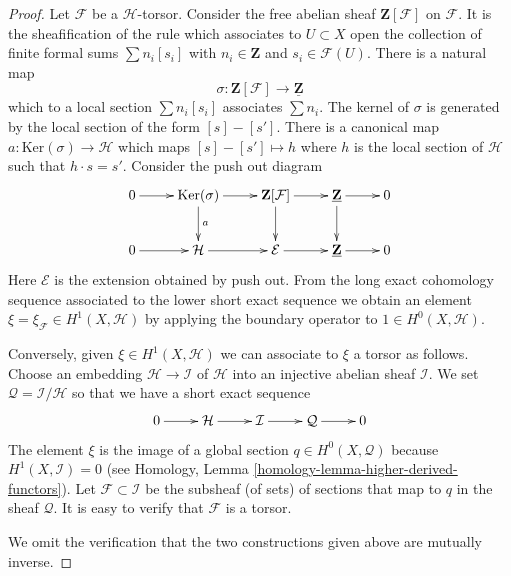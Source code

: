 \begin{proof}
Let $\mathcal{F}$ be a $\mathcal{H}$-torsor.
Consider the free abelian sheaf $\mathbf{Z}[\mathcal{F}]$
on $\mathcal{F}$. It is the sheafification of the rule
which associates to $U \subset X$ open the collection of finite
formal sums $\sum n_i[s_i]$ with $n_i \in \mathbf{Z}$
and $s_i \in \mathcal{F}(U)$. There is a natural map
$$
\sigma : \mathbf{Z}[\mathcal{F}] \longrightarrow \underline{\mathbf{Z}}
$$
which to a local section $\sum n_i[s_i]$ associates $\sum n_i$.
The kernel of $\sigma$ is generated by the local section of the form
$[s] - [s']$. There is a canonical map
$a : \text{Ker}(\sigma) \to \mathcal{H}$
which maps $[s] - [s'] \mapsto h$ where $h$ is the local section of
$\mathcal{H}$ such that $h \cdot s = s'$. Consider the push out diagram
$$
\xymatrix{
0 \ar[r] &
\text{Ker}(\sigma) \ar[r] \ar[d]^a &
\mathbf{Z}[\mathcal{F}] \ar[r] \ar[d] &
\underline{\mathbf{Z}} \ar[r] \ar[d] &
0 \\
0 \ar[r] &
\mathcal{H} \ar[r] &
\mathcal{E} \ar[r] & 
\underline{\mathbf{Z}} \ar[r] &
0
}
$$
Here $\mathcal{E}$ is the extension obtained by push out.
From the long exact cohomology sequence associated to the lower
short exact sequence we obtain an element
$\xi = \xi_{\mathcal{F}} \in H^1(X, \mathcal{H})$
by applying the boundary operator to $1 \in H^0(X, \mathcal{H})$.

\medskip\noindent
Conversely, given $\xi \in H^1(X, \mathcal{H})$ we can associate to
$\xi$ a torsor as follows. Choose an embedding $\mathcal{H} \to \mathcal{I}$
of $\mathcal{H}$ into an injective abelian sheaf $\mathcal{I}$. We set
$\mathcal{Q} = \mathcal{I}/\mathcal{H}$ so that we have a short exact
sequence
$$
\xymatrix{
0 \ar[r] &
\mathcal{H} \ar[r] &
\mathcal{I} \ar[r] & 
\mathcal{Q} \ar[r] &
0
}
$$
The element $\xi$ is the image of a global section $q \in H^0(X, \mathcal{Q})$
because $H^1(X, \mathcal{I}) = 0$ (see
Homology, Lemma \ref{homology-lemma-higher-derived-functors}).
Let $\mathcal{F} \subset \mathcal{I}$ be the subsheaf (of sets) of sections
that map to $q$ in the sheaf $\mathcal{Q}$. It is easy to verify that
$\mathcal{F}$ is a torsor.

\medskip\noindent
We omit the verification that the two constructions given
above are mutually inverse.
\end{proof}
























